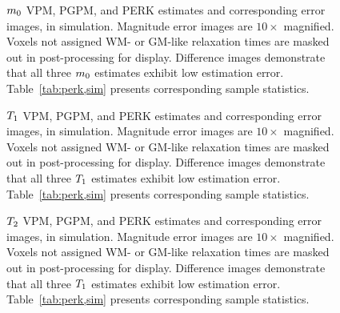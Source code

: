 \begin{figure}[!ht]
	\centering
	\hspace{0cm}
	\caption{%
		$m_0$ VPM, PGPM, and PERK estimates
		and corresponding error images,
		in simulation.
		Magnitude error images are $10\times$ magnified.
		Voxels not assigned WM- or GM-like relaxation times
		are masked out in post-processing for display.
		Difference images demonstrate
		that all three $m_0$ estimates
		exhibit low estimation error.
		Table~\ref{tab:perk,sim} presents
		corresponding sample statistics.
	}
	\label{fig:perk,sim,m0}
\end{figure}
	
\begin{figure}[!ht]
	\centering
	\hspace{0cm}
	\caption{%
		$T_1$	VPM, PGPM, and PERK estimates
		and corresponding error images,
		in simulation.
		Magnitude error images are $10\times$ magnified.
		Voxels not assigned WM- or GM-like relaxation times
		are masked out in post-processing for display.
		Difference images demonstrate
		that all three $T_1$ estimates
		exhibit low estimation error.
		Table~\ref{tab:perk,sim} presents
		corresponding sample statistics.
	}
	\label{fig:perk,sim,t1}
\end{figure}

\begin{figure}[!ht]
	\centering
	\hspace{0cm}
	\caption{%
		$T_2$ VPM, PGPM, and PERK estimates
		and corresponding error images,
		in simulation.
		Magnitude error images are $10\times$ magnified.
		Voxels not assigned WM- or GM-like relaxation times
		are masked out in post-processing for display.
		Difference images demonstrate
		that all three $T_1$ estimates
		exhibit low estimation error.
		Table~\ref{tab:perk,sim} presents
		corresponding sample statistics.
	}
	\label{fig:perk,sim,t2}
\end{figure}

